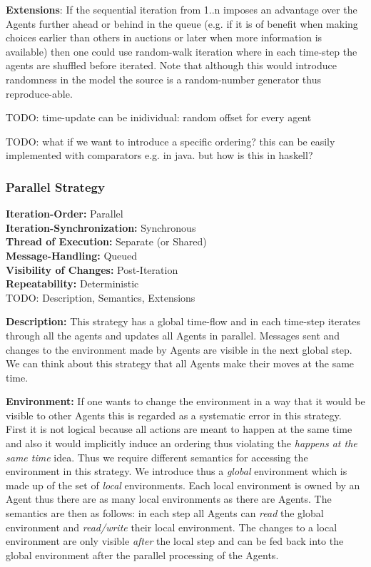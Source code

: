 \textbf{Extensions}: If the sequential iteration from 1..n imposes an advantage over the Agents further ahead or behind in the queue (e.g. if it is of benefit when making choices earlier than others in auctions or later when more information is available) then one could use random-walk iteration where in each time-step the agents are shuffled before iterated. Note that although this would introduce randomness in the model the source is a random-number generator thus reproduce-able.
	
TODO: time-update can be inidividual: random offset for every agent

TODO: what if we want to introduce a specific ordering? this can be easily implemented with comparators e.g. in java. but how is this in haskell?

\subsubsection{Parallel Strategy}
\textbf{Iteration-Order:} Parallel \\
\textbf{Iteration-Synchronization:}	Synchronous \\
\textbf{Thread of Execution:} Separate (or Shared) \\
\textbf{Message-Handling:} Queued \\
\textbf{Visibility of Changes:}	Post-Iteration \\
\textbf{Repeatability:}	Deterministic \\

TODO: Description, Semantics, Extensions

\textbf{Description:} This strategy has a global time-flow and in each time-step iterates through all the agents and updates all Agents in parallel. Messages sent and changes to the environment made by Agents are visible in the next global step. We can think about this strategy that all Agents make their moves at the same time. 

\textbf{Environment:} If one wants to change the environment in a way that it would be visible to other Agents this is regarded as a systematic error in this strategy. First it is not logical because all actions are meant to happen at the same time and also it would implicitly induce an ordering thus violating the \textit{happens at the same time} idea. Thus we require different semantics for accessing the environment in this strategy. We introduce thus a \textit{global} environment which is made up of the set of \textit{local} environments. Each local environment is owned by an Agent thus there are as many local environments as there are Agents. The semantics are then as follows: in each step all Agents can \textit{read} the global environment and \textit{read/write} their local environment. The changes to a local environment are only visible \textit{after} the local step and can be fed back into the global environment after the parallel processing of the Agents.

